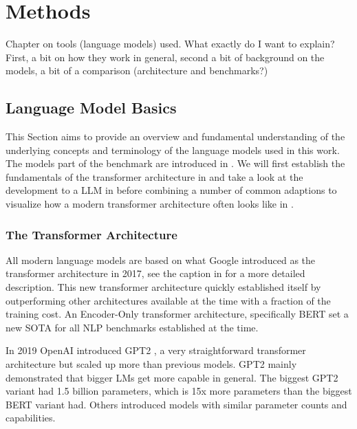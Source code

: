 \chapter{Methods}\label{chap:methods}
{\color{blue}
Chapter on tools (language models) used. What exactly do I want to explain?
First, a bit on how they work in general, second a bit of background on the models, a bit of a comparison (architecture and benchmarks?)
}


\section{Language Model Basics}\label{sec:basics}
This Section aims to provide an overview and fundamental understanding of the underlying concepts and terminology of the language models used in this work.
The models part of the benchmark are introduced in .
We will first establish the fundamentals of the transformer architecture in  and take a look at the development to a \acrlong{LLM} in  before combining a number of common adaptions to visualize how a modern transformer architecture often looks like in .


\subsection{The Transformer Architecture}\label{sub:transformer}

All modern language models are based on what Google introduced as the transformer architecture \cite{vaswani_attention_2017} in 2017, see the caption in  for a more detailed description.
This new transformer architecture quickly established itself by outperforming other architectures available at the time with a fraction of the training cost.
An Encoder-Only transformer architecture, specifically \gls{BERT} set a new \gls{SOTA} for all \gls{NLP} benchmarks established at the time.

In 2019 \gls{OpenAI} introduced \gls{GPT2} \cite{radford_language_2019}, a very straightforward transformer architecture but scaled up more than previous models. \gls{GPT2} mainly demonstrated that bigger \glspl{LM} get more capable in general.
The biggest \gls{GPT2} variant had 1.5 billion parameters, which is 15x more parameters than the biggest \gls{BERT} variant had.
Others introduced models with similar parameter counts and capabilities.

